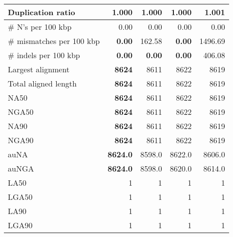 \documentclass[12pt,a4paper]{article}
\begin{document}
\begin{table}[ht]
\begin{center}
\begin{tabular}{|l*{4}{|r}|}
Duplication ratio & {\bf 1.000} & {\bf 1.000} & {\bf 1.000} & 1.001 \\ \hline
\# N's per 100 kbp & 0.00 & 0.00 & 0.00 & 0.00 \\ \hline
\# mismatches per 100 kbp & {\bf 0.00} & 162.58 & {\bf 0.00} & 1496.69 \\ \hline
\# indels per 100 kbp & {\bf 0.00} & {\bf 0.00} & {\bf 0.00} & 406.08 \\ \hline
Largest alignment & {\bf 8624} & 8611 & 8622 & 8619 \\ \hline
Total aligned length & {\bf 8624} & 8611 & 8622 & 8619 \\ \hline
NA50 & {\bf 8624} & 8611 & 8622 & 8619 \\ \hline
NGA50 & {\bf 8624} & 8611 & 8622 & 8619 \\ \hline
NA90 & {\bf 8624} & 8611 & 8622 & 8619 \\ \hline
NGA90 & {\bf 8624} & 8611 & 8622 & 8619 \\ \hline
auNA & {\bf 8624.0} & 8598.0 & 8622.0 & 8606.0 \\ \hline
auNGA & {\bf 8624.0} & 8598.0 & 8620.0 & 8614.0 \\ \hline
LA50 & 1 & 1 & 1 & 1 \\ \hline
LGA50 & 1 & 1 & 1 & 1 \\ \hline
LA90 & 1 & 1 & 1 & 1 \\ \hline
LGA90 & 1 & 1 & 1 & 1 \\ \hline
\end{tabular}
\end{center}
\end{table}
\end{document}
